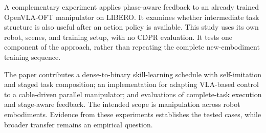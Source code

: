 A complementary experiment applies phase-aware feedback to an already trained OpenVLA-OFT manipulator on LIBERO. It examines whether intermediate task structure is also useful after an action policy is available. This study uses its own robot, scenes, and training setup, with no CDPR evaluation. It tests one component of the approach, rather than repeating the complete new-embodiment training sequence.

The paper contributes a dense-to-binary skill-learning schedule with self-imitation and staged task composition; an implementation for adapting VLA-based control to a cable-driven parallel manipulator; and evaluations of complete-task execution and stage-aware feedback. The intended scope is manipulation across robot embodiments. Evidence from these experiments establishes the tested cases, while broader transfer remains an empirical question.
